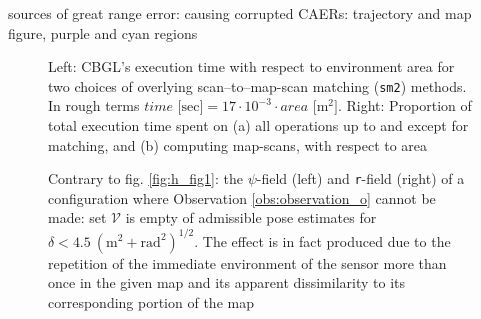 sources of great range error: causing corrupted CAERs: trajectory and map figure,
purple and cyan regions


\begin{figure}
  
  \vspace{0.2cm}
  \caption{\small Left: CBGL's execution time with respect to environment area
           for two choices of overlying scan--to--map-scan matching
           (\texttt{sm2}) methods. In rough terms
           $time \text{ [sec]} = 17\cdot10^{-3}\cdot area \text{ [} \text{m}^2 \text{]}$.
           Right: Proportion of total execution time
           spent on (a) all operations up to and except for matching, and (b)
           computing map-scans, with respect to area}
  \label{fig:c:time_analysis}
\end{figure}


\begin{figure}%
  
  \vspace{0.7cm}
  \caption{\small Contrary to fig. \ref{fig:h_fig1}: the $\psi$-field (left)
           and \texttt{r}-field (right) of a configuration where Observation
           \ref{obs:observation_o} cannot be made: set $\mathcal{V}$ is
           empty of admissible pose estimates for $\delta < 4.5 \ (\text{m}^2 + \text{rad}^2)^{1/2}$.
           The effect is in fact produced due to the repetition of the
           immediate environment of the sensor more than once in the given map
           and its apparent dissimilarity to its corresponding portion of the
           map}
  \label{fig:h_not_fig1}
\end{figure}

